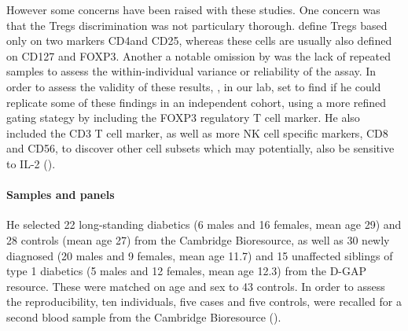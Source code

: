 However some concerns have been raised with these studies.
One concern was that the Tregs discrimination was not particulary thorough.
\citet{Long:2010ej} define Tregs based only on two markers CD4\positive and CD25\positive, whereas these cells are usually also defined on CD127 and FOXP3.
Another a notable omission by \citet{Long:2010ej} was the lack of repeated samples to assess the within-individual variance or reliability of the assay.
In order to assess the validity of these results, , in our lab, set to find if he could replicate some of these findings in an independent cohort, using a more refined gating stategy by including the FOXP3 regulatory T cell marker.
He also included the CD3 T cell marker, as well as more NK cell specific markers, CD8 and CD56,
to discover other cell subsets which may potentially, also be sensitive to IL-2 ().

\paragraph{Samples and panels}

He selected 22 long-standing diabetics (6 males and 16 females, mean age 29) and 28 controls (mean age 27) from the Cambridge Bioresource, as well as 30 newly diagnosed (20 males and 9 females, mean age 11.7) and 15 unaffected siblings of type 1 diabetics (5 males and 12 females, mean age 12.3) from the \Gls{D-GAP} resource.  
These were matched on age and sex to 43 controls.
In order to assess the reproducibility, ten individuals, five cases and five controls, were recalled for a second blood sample from the Cambridge Bioresource ().

